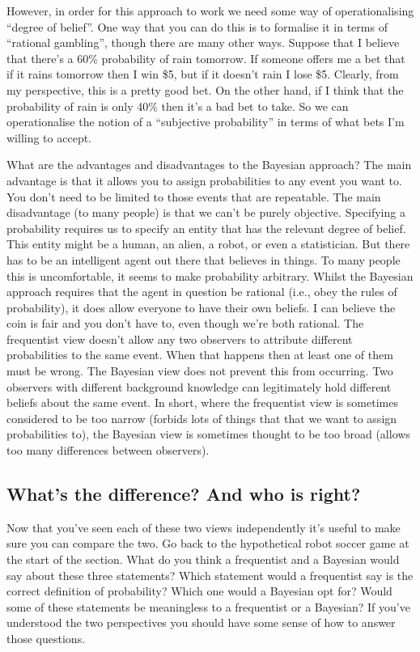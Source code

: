 However, in order for this approach to work we need some way of operationalising ``degree of belief''. One way that you can do this is to formalise it in terms of ``rational gambling'', though there are many other ways. Suppose that I believe that there's a 60\% probability of rain tomorrow. If someone offers me a bet that  if it rains tomorrow then I win \$5, but if it doesn't rain I lose \$5. Clearly, from my perspective, this is a pretty good bet. On the other hand, if I think that the probability of rain is only 40\% then it's a bad bet to take. So we can operationalise the notion of a ``subjective probability'' in terms of what bets I'm willing to accept. 

What are the advantages and disadvantages to the Bayesian approach? The main advantage is that it allows you to assign probabilities to any event you want to. You don't need to be limited to those events that are repeatable. The main disadvantage (to many people) is that we can't be purely objective. Specifying a probability requires us to specify an entity that has the relevant degree of belief. This entity might be a human, an alien, a robot, or even a statistician. But there has to be an intelligent agent out there that believes in things. To many people this is uncomfortable, it seems to make probability arbitrary. Whilst the Bayesian approach requires that the agent in question be rational (i.e., obey the rules of probability), it does allow everyone to have their own beliefs. I can believe the coin is fair and you don't have to, even though we're both rational. The frequentist view doesn't allow any two observers to attribute different probabilities to the same event. When that happens then at least one of them must be wrong. The Bayesian view does not prevent this from occurring. Two observers with different background knowledge can legitimately hold different beliefs about the same event. In short, where the frequentist view is sometimes considered to be too narrow (forbids lots of things that that we want to assign probabilities to), the Bayesian view is sometimes thought to be too broad (allows too many differences between observers). 

\subsection{What's the difference? And who is right?}

Now that you've seen each of these two views independently it's useful to make sure you can compare the two. Go back to the hypothetical robot soccer game at the start of the section. What do you think a frequentist and a Bayesian would say about these three statements? Which statement would a frequentist say is the correct definition of probability? Which one would a Bayesian opt for? Would some of these statements be meaningless to a frequentist or a Bayesian? If you've understood the two perspectives you should have some sense of how to answer those questions.

